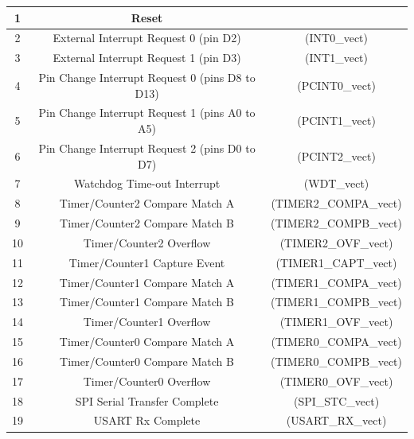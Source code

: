 \documentclass[a4paper,12pt,portuguese]{ufms-cpcx}
\begin{document}
\begin{table}[!h]
	\renewcommand{\arraystretch}{1.3}
	\centering
	\begin{tabular}{|c|cc|}
		\hline
		1  &                      Reset                      &  \\ \hline
		2  &     External Interrupt Request 0  (pin D2)      &     (INT0\_vect)     \\ \hline
		3  &     External Interrupt Request 1  (pin D3)      &     (INT1\_vect)     \\ \hline
		4  & Pin Change Interrupt Request 0 (pins D8 to D13) &    (PCINT0\_vect)    \\ \hline
		5  & Pin Change Interrupt Request 1 (pins A0 to A5)  &    (PCINT1\_vect)    \\ \hline
		6  & Pin Change Interrupt Request 2 (pins D0 to D7)  &    (PCINT2\_vect)    \\ \hline
		7  &           Watchdog Time-out Interrupt           &     (WDT\_vect)      \\ \hline
		8  &         Timer/Counter2 Compare Match A          & (TIMER2\_COMPA\_vect) \\ \hline
		9  &         Timer/Counter2 Compare Match B          & (TIMER2\_COMPB\_vect) \\ \hline
		10 &             Timer/Counter2 Overflow             &  (TIMER2\_OVF\_vect)  \\ \hline
		11 &          Timer/Counter1 Capture Event           & (TIMER1\_CAPT\_vect)  \\ \hline
		12 &         Timer/Counter1 Compare Match A          & (TIMER1\_COMPA\_vect) \\ \hline
		13 &         Timer/Counter1 Compare Match B          & (TIMER1\_COMPB\_vect) \\ \hline
		14 &             Timer/Counter1 Overflow             &  (TIMER1\_OVF\_vect)  \\ \hline
		15 &         Timer/Counter0 Compare Match A          & (TIMER0\_COMPA\_vect) \\ \hline
		16 &         Timer/Counter0 Compare Match B          & (TIMER0\_COMPB\_vect) \\ \hline
		17 &             Timer/Counter0 Overflow             &  (TIMER0\_OVF\_vect)  \\ \hline
		18 &          SPI Serial Transfer Complete           &   (SPI\_STC\_vect)    \\ \hline
		19 &                USART Rx Complete                &   (USART\_RX\_vect)   \\ \hline

\end{tabular}
\end{table}
\end{document}
